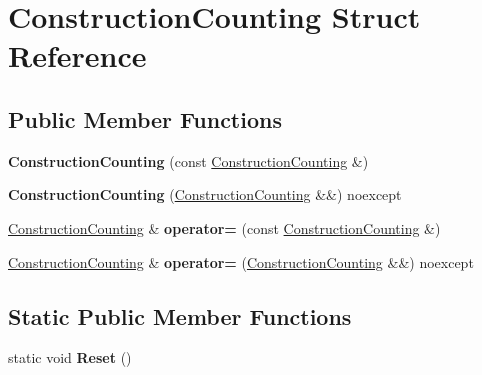 \hypertarget{structConstructionCounting}{}\section{Construction\+Counting Struct Reference}
\label{structConstructionCounting}
\subsection*{Public Member Functions}
\begin{DoxyCompactItemize}
\item 
\mbox{\label{structConstructionCounting_aa5974ac890ae33380e83caff7d42cff3}} 
{\bfseries Construction\+Counting} (const \mbox{\hyperlink{structConstructionCounting}{Construction\+Counting}} \&)
\item 
\mbox{\label{structConstructionCounting_a9cfd083c0a68329d98e34ac1e195deb1}} 
{\bfseries Construction\+Counting} (\mbox{\hyperlink{structConstructionCounting}{Construction\+Counting}} \&\&) noexcept
\item 
\mbox{\label{structConstructionCounting_a7d3fc44931e0fc695a85413ad0f0d634}} 
\mbox{\hyperlink{structConstructionCounting}{Construction\+Counting}} \& {\bfseries operator=} (const \mbox{\hyperlink{structConstructionCounting}{Construction\+Counting}} \&)
\item 
\mbox{\label{structConstructionCounting_af328d8761e1919a9b252be305f5134a8}} 
\mbox{\hyperlink{structConstructionCounting}{Construction\+Counting}} \& {\bfseries operator=} (\mbox{\hyperlink{structConstructionCounting}{Construction\+Counting}} \&\&) noexcept
\end{DoxyCompactItemize}
\subsection*{Static Public Member Functions}
\begin{DoxyCompactItemize}
\item 
\mbox{\label{structConstructionCounting_a24dfda5ae3575e4bd633d619572306cd}} 
static void {\bfseries Reset} ()
\end{DoxyCompactItemize}
